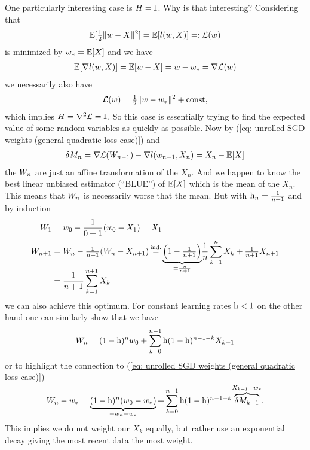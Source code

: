 One particularly interesting case is \(H=\mathbb{I}\). Why is that interesting?
Considering that
\begin{align*}
	\mathbb{E}[\tfrac12\|w-X\|^2]=\mathbb{E}[l(w,X)]=:\mathcal{L}(w)
\end{align*}
is minimized by \(w_*=\mathbb{E}[X]\) and we have
\begin{align*}
	\mathbb{E}[\nabla l(w,X)]
	=\mathbb{E}[w-X]=w- w_*=\nabla\mathcal{L}(w)
\end{align*}
we necessarily also have
\begin{align*}
	\mathcal{L}(w) = \tfrac12\|w-w_*\|^2 + \text{const},
\end{align*}
which implies \(H=\nabla^2\mathcal{L}=\mathbb{I}\). So this case is essentially
trying to find the expected value of some random variables as quickly as
possible. Now by (\ref{eq: unrolled SGD weights (general
quadratic loss case)}) and
\begin{align*}
	\delta M_n = \nabla\mathcal{L}(W_{n-1}) -\nabla l(w_{n-1}, X_n)
	= X_n - \mathbb{E}[X]
\end{align*}
the \(W_n\) are just an affine transformation of the \(X_n\). And we
happen to know the best linear unbiased estimator (``BLUE'') of \(\mathbb{E}[X]\)
which is the mean of the \(X_n\). This means that \(W_n\) is
necessarily worse that the mean. But with \(\text{h}_n=\frac1{n+1}\) and by
induction
\begin{align}
	\label{eq: getting rid of w_0 first step}
	\Weights_1 &= \weights_0 - \frac{1}{0+1}(\weights_0 - X_1) = X_1\\
	\nonumber
	\Weights_{n+1}
	&= \Weights_n - \tfrac{1}{n+1}(\Weights_n - X_{n+1})
	\xeq{\text{ind.}}\smash{\underbrace{\left(1-\tfrac1{n+1}\right)}_{=\frac{n}{n+1}}}
	\frac1n\sum_{k=1}^n X_k + \tfrac{1}{n+1}X_{n+1}\\
	\nonumber
	&= \frac{1}{n+1}\sum_{k=1}^{n+1}X_k
\end{align}
we can also achieve this optimum. For constant learning rates \(\text{h}<1\) on the
other hand one can similarly show that we have
\begin{align*}
	W_n = (1-\text{h})^nw_0 + \sum_{k=0}^{n-1}\text{h}(1-\text{h})^{n-1-k}X_{k+1}
\end{align*}
or to highlight the connection to (\ref{eq: unrolled SGD weights (general
quadratic loss case)})
\begin{align*}
	W_n - w_*
	= \underbrace{(1-\text{h})^n(w_0 -w_*)}_{=w_n-w_*}
	+ \sum_{k=0}^{n-1}\text{h}(1-\text{h})^{n-1-k}
	\smash{\overbrace{\delta M_{k+1}}^{X_{k+1}-w_*}}.
\end{align*}
This implies we do not weight our \(X_k\) equally, but rather use an
exponential decay giving the most recent data the most weight.

